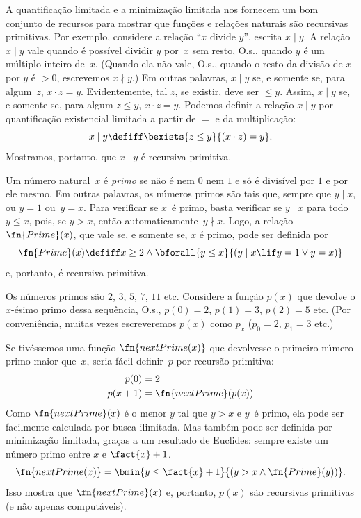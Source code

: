 \documentclass[../../../include/open-logic-section]{subfiles}
\begin{document}

A quantificação limitada e a minimização limitada nos fornecem um bom
conjunto de recursos para mostrar que funções e relações naturais são
recursivas primitivas. Por exemplo, considere a relação ``$x$ divide
$y$'', escrita $x \mid y$. A relação $x \mid y$ vale quando é possível
dividir $y$ por~$x$ sem resto, O.s.\@, quando $y$ é um múltiplo inteiro
de~$x$. (Quando ela não vale, O.s.\@, quando o resto da divisão de $x$
por $y$ é $> 0$, escrevemos $x \nmid y$.) Em outras palavras, $x \mid y$
se, e somente se, para algum~$z$, $x \cdot z = y$. Evidentemente, tal
$z$, se existir, deve ser $\leq y$. Assim, $x \mid y$ se, e somente se,
para algum $z \le y$, $x \cdot z = y$. Podemos definir a relação
$x \mid y$ por quantificação existencial limitada a partir de $=$ e da
multiplicação:
\[
x \mid y \defiff \bexists{z \leq y}{(x \cdot z) = y}.
\]
Mostramos, portanto, que $x \mid y$ é recursiva primitiva.

Um número natural~$x$ é \emph{primo} se não é nem $0$ nem $1$ e só é
divisível por $1$ e por ele mesmo. Em outras palavras, os números primos
são tais que, sempre que $y \mid x$, ou $y = 1$ ou~$y=x$. Para verificar
se $x$~é primo, basta verificar se $y \mid x$ para todo $y \le x$, pois,
se $y > x$, então automaticamente~$y \nmid x$. Logo, a relação
$\fn{Prime}(x)$, que vale se, e somente se, $x$ é primo, pode ser definida
por
\[
\fn{Prime}(x) \defiff x \geq 2 \land \bforall{y \leq x}{(y \mid x \lif y
  = 1 \lor y = x)}
\]
e, portanto, é recursiva primitiva.

Os números primos são $2$, $3$, $5$, $7$, $11$ etc. Considere a função
$p(x)$ que devolve o $x$-ésimo primo dessa sequência, O.s.\@, $p(0) =
2$, $p(1) = 3$, $p(2) = 5$ etc. (Por conveniência, muitas vezes
escreveremos $p(x)$ como $p_x$ ($p_0=2$, $p_1=3$ etc.)

Se tivéssemos uma função
$\fn{nextPrime(x)}$ que devolvesse o primeiro número primo maior
que~$x$, seria fácil definir~$p$ por recursão primitiva:
\begin{align*}
  p(0) & = 2\\
  p(x+1) & = \fn{nextPrime}(p(x))
\end{align*}
Como $\fn{nextPrime}(x)$ é o menor $y$ tal que $y > x$ e $y$~é primo,
ela pode ser facilmente calculada por busca ilimitada. Mas também pode
ser definida por minimização limitada, graças a um resultado de Euclides:
sempre existe um número primo entre $x$ e $\fact{x}+1$.
\[
  \fn{nextPrime(x)} =
  \bmin{y \leq \fact{x}+1}{(y > x \land \fn{Prime}(y))}.
\]
Isso mostra que $\fn{nextPrime}(x)$ e, portanto, $p(x)$ são recursivas
primitivas (e não apenas computáveis).
\end{document}
